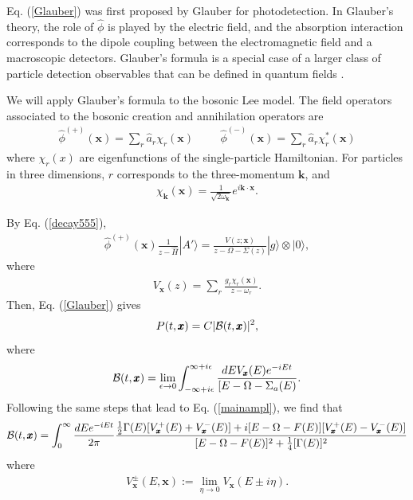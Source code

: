 \documentclass[12pt]{article}
\numberwithin{equation}{section}
\begin{document}
Eq. (\ref{Glauber}) was first proposed by Glauber for photodetection. In Glauber's theory,  the role of $\hat{\phi}$ is played by the electric field, and the absorption interaction corresponds to the dipole coupling between the electromagnetic field and a macroscopic detectors.    Glauber's formula is a special case of a larger class of particle detection observables that can be defined in quantum fields \cite{AnSav}.


We will apply Glauber's formula to the bosonic Lee model. The field operators associated to the bosonic creation and annihilation operators are
\begin{eqnarray}
\hat{\phi}^{(+)}({\pmb x}) = \sum_r \hat{a}_r \chi_r({\pmb x}) \hspace{1cm}  \hat{\phi}^{(-)}({\pmb x}) = \sum_r \hat{a}_r \chi^*_r({\pmb x}) \label{scalar}
\end{eqnarray}
where $\chi_r(x)$ are eigenfunctions of the single-particle Hamiltonian. For particles in three dimensions,  $r$ corresponds to the three-momentum ${\pmb k}$, and
\begin{eqnarray}
\chi_{\pmb k}({\pmb x}) = \frac{1}{\sqrt{2 \omega_{\pmb k}} }e^{i{\pmb k} \cdot {\pmb x}}. \label{chik}
\end{eqnarray}

By Eq. (\ref{decay555}),
\begin{eqnarray}
\hat{\phi}^{(+)}({\pmb x}) \frac{1}{z - \hat{H}} |A'\rangle = \frac{V(z; {\pmb x})}{z - \Omega - \Sigma(z)} |g\rangle \otimes  |0\rangle,
\end{eqnarray}
where
\begin{eqnarray}
V_ {\pmb x}(z)  = \sum_r \frac{g_r \chi_r({\pmb x})  }{z- \omega_r}. \label{Vz}
\end{eqnarray}
Then, Eq. (\ref{Glauber}) gives
\begin{eqnarray}
P(t, {\pmb x})  = C  |{\cal B}(t, {\pmb x})|^2, \label{Glauber2}
\end{eqnarray}
where
\begin{eqnarray}
{\cal B}(t, {\pmb x}) =   \lim_{\epsilon \rightarrow 0} \int_{-\infty+i \epsilon }^{\infty+i \epsilon } \frac{dE V_ {\pmb x}(E)  e^{-iEt}}{[E - \Omega - \Sigma_a(E) }.
\end{eqnarray}
Following the same steps that lead to  Eq. (\ref{mainampl}), we find that
\begin{eqnarray}
{\cal B}(t,  {\pmb x}) =
   \int_{0 }^{\infty } \frac{dE e^{-iEt}}{2\pi}  \frac{ \frac{1}{2}\Gamma(E) [V_{\pmb x}^+(E) +V_{\pmb x}^-(E) ] + i [E - \Omega - F(E)][V_{\pmb x}^+(E) - V_{\pmb x}^-(E) ]  }{ [E - \Omega - F(E)]^2 + \frac{1}{4}[\Gamma(E)]^2} \label{mainampl44}
\end{eqnarray}
 where
 \begin{eqnarray}
 V_{\pmb x}^{\pm}(E, {\pmb x}) :=   \lim_{\eta \rightarrow 0 } V_{\pmb x}(E \pm i \eta).
 \end{eqnarray}
\end{document}
